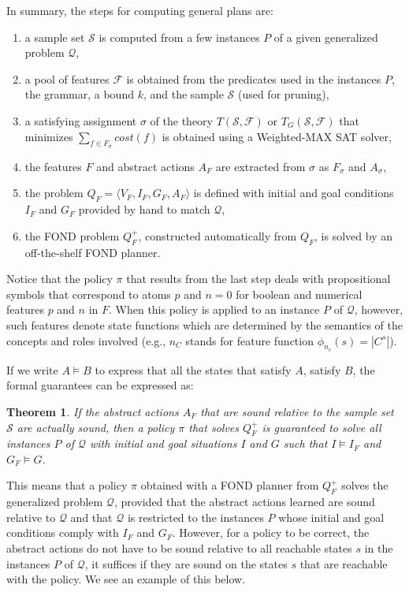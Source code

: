 \documentclass[letterpaper]{article} %
\newcommand{\tup}[1]{\langle #1 \rangle}
\newtheorem{theorem}[definition]{Theorem}
\newcommand{\Q}{\mathcal{Q}}
\newcommand{\F}{\mathcal{F}}
\renewcommand{\S}{\mathcal{S}}
\begin{document}
In summary, the steps for computing general plans are:
\begin{enumerate}[1.]
  \item a sample set $\S$ is computed from a few instances $P$ of a given
    generalized problem $\Q$,
  \item a pool of features $\F$ is obtained from the predicates used in the
    instances $P$, the grammar, a  bound $k$, and the sample $\S$ (used for
    pruning),
  \item a satisfying assignment $\sigma$ of the theory $T(\S,\F)$ or $T_G(\S,\F)$
    that minimizes $\sum_{f \in F_{\sigma}} cost(f)$ is obtained using a
    Weighted-MAX SAT solver,
  \item the features $F$ and abstract actions $A_F$ are extracted from $\sigma$
    as $F_{\sigma}$ and $A_{\sigma}$,
  \item the problem $Q_F=\tup{V_F,I_F,G_F,A_F}$ is defined with initial and goal
    conditions $I_F$ and $G_F$ provided by hand to match $\Q$, 
  \item the FOND problem $Q^+_F$, constructed automatically from $Q_F$, is solved by an off-the-shelf
    FOND planner.
\end{enumerate}

Notice that the policy $\pi$ that results from the last step deals with
propositional symbols that correspond to atoms $p$ and $n=0$ for boolean
and numerical features $p$ and $n$ in $F$.
When this policy is applied to an instance $P$ of $\Q$, however, such features denote state functions
which are determined by the  semantics of the concepts and roles involved
(e.g., $n_C$ stands for feature function $\phi_{n_c}(s)=|C^s|$).

If we write $A \vDash B$ to express that all the states that satisfy $A$, satisfy $B$, 
the formal guarantees can be expressed as:

\begin{theorem}
If the abstract actions $A_F$ that are sound relative to the sample set $\S$  are actually sound,
then a   policy $\pi$ that solves  $Q^+_F$  is guaranteed to solve  all instances $P$ of $\Q$
with initial and goal situations $I$ and $G$ such that $I \vDash  I_F$ and $G_F \vDash G$.
\end{theorem}

This means that a policy $\pi$ obtained with a FOND planner from $Q^+_F$ 
solves the generalized problem $\Q$, provided that the abstract actions
learned are sound relative to $\Q$ and that $\Q$ is restricted to the instances $P$ whose
initial and goal conditions comply with   $I_F$ and $G_F$.
However,  for a policy to be correct, the abstract actions do
not have to be sound relative to all reachable states $s$ in the instances $P$ of $\Q$, it  suffices
if they are sound on the states $s$ that are reachable with the policy. We see an example of this below.
\end{document}
